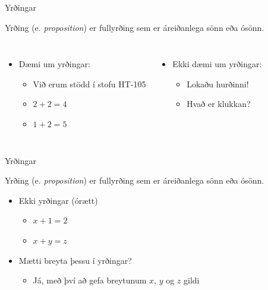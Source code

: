 \documentclass[handout]{beamer}
\begin{document}
\begin{frame}{Yrðingar}
\begin{tcolorbox}[title=Yrðing]
Yrðing (e. \emph{proposition}) er fullyrðing sem er áreiðanlega sönn eða ósönn.
\end{tcolorbox}
\begin{columns}
\begin{itemize}
 \item Dæmi um yrðingar:
 \begin{itemize}
  \item Við erum stödd í stofu HT-105
  \item $2 + 2 = 4$
  \item $1 + 2 = 5$
 \end{itemize}
\end{itemize}
\begin{itemize}
 \item Ekki dæmi um yrðingar:
 \begin{itemize}
  \item Lokaðu hurðinni!
  \item Hvað er klukkan?
 \end{itemize}
\end{itemize}
\end{columns}
\end{frame}

\begin{frame}{Yrðingar}
\begin{tcolorbox}[title=Yrðing]
Yrðing (e. \emph{proposition}) er fullyrðing sem er áreiðanlega sönn eða ósönn.
\end{tcolorbox}
\begin{itemize}
 \item Ekki yrðingar (órætt)
 \begin{itemize}
  \item $x + 1 = 2$
  \item $x + y = z$
 \end{itemize} \pause
 \item Mætti breyta þessu í yrðingar?\pause
 \begin{itemize}
  \item Já, með því að gefa breytunum $x$, $y$ og $z$ gildi
 \end{itemize}
\end{itemize}
\end{frame}
\end{document}
